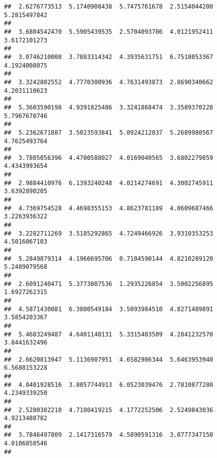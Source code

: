 \documentclass[]{article}
\begin{document}
\begin{verbatim}
##  2.6276773513  5.1740908438  5.7475761678  2.5154044200  5.2815497842 
##                                                                       
##  3.6804542470  5.5905439535  2.5704093786  4.0121952411  3.6172101273 
##                                                                       
##  3.0746210008  3.7883314342  4.3935631751  6.7518053367  4.1924008075 
##                                                                       
##  3.3242802552  4.7770300936  4.7631493873  2.8690340662  4.2031110623 
##                                                                       
##  5.3603590198  4.9391825486  3.3241868474  3.3589370228  5.7967670746 
##                                                                       
##  5.2362671887  3.5023593841  5.0924212037  5.2689980567  4.7625493764 
##                                                                       
##  3.7805056396  4.4700588027  4.0169040565  3.6802279859  4.4343993654 
##                                                                       
##  2.9884410976  6.1393240248  4.0214274691  4.3002745911  3.6392890205 
##                                                                       
##  4.7369754528  4.4698355153  4.8623781189  4.0609687466  3.2263936322 
##                                                                       
##  3.2282711269  3.5185292865  4.7249466926  3.9310353253  4.5016067103 
##                                                                       
##  5.2849879314  4.1966695706  0.7104590144  4.8210289120  5.2489079568 
##                                                                       
##  2.6091240471  5.3773807536  1.2935226854  3.5002256895  1.6927262315 
##                                                                       
##  4.5871430081  6.3800549184  3.5093984510  4.8271489891  3.5854203367 
##                                                                       
##  5.4683249487  4.6401140131  5.3315403509  4.2841232570  3.8441632496 
##                                                                       
##  2.6620813947  5.1136907951  4.6582986344  5.6463953940  6.5688153228 
##                                                                       
##  4.0401928516  3.8057744913  6.0523039476  2.7810877280  4.2349339250 
##                                                                       
##  2.5280382210  4.7100419215  4.1772252506  2.5249843036  4.9213488782 
##                                                                       
##  3.7846497809  2.1417316579  4.5890591316  3.8777347150  4.0106850546 
##                                                                       

\end{verbatim}
\end{document}
